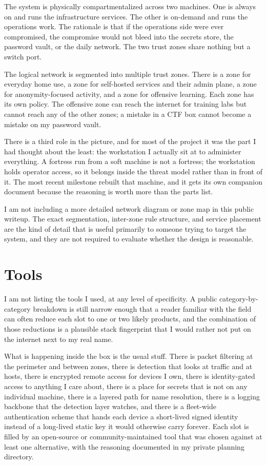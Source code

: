 \documentclass[12pt]{article}
\begin{document}
The system is physically compartmentalized across two machines. One is always on and runs the infrastructure services. The other is on-demand and runs the operations work. The rationale is that if the operations side were ever compromised, the compromise would not bleed into the secrets store, the password vault, or the daily network. The two trust zones share nothing but a switch port.

The logical network is segmented into multiple trust zones. There is a zone for everyday home use, a zone for self-hosted services and their admin plane, a zone for anonymity-focused activity, and a zone for offensive learning. Each zone has its own policy. The offensive zone can reach the internet for training labs but cannot reach any of the other zones; a mistake in a CTF box cannot become a mistake on my password vault.

There is a third role in the picture, and for most of the project it was the part I had thought about the least: the workstation I actually sit at to administer everything. A fortress run from a soft machine is not a fortress; the workstation holds operator access, so it belongs inside the threat model rather than in front of it. The most recent milestone rebuilt that machine, and it gets its own companion document because the reasoning is worth more than the parts list.

I am not including a more detailed network diagram or zone map in this public writeup. The exact segmentation, inter-zone rule structure, and service placement are the kind of detail that is useful primarily to someone trying to target the system, and they are not required to evaluate whether the design is reasonable.

\section{Tools}

I am not listing the tools I used, at any level of specificity. A public category-by-category breakdown is still narrow enough that a reader familiar with the field can often reduce each slot to one or two likely products, and the combination of those reductions is a plausible stack fingerprint that I would rather not put on the internet next to my real name.

What is happening inside the box is the usual stuff. There is packet filtering at the perimeter and between zones, there is detection that looks at traffic and at hosts, there is encrypted remote access for devices I own, there is identity-gated access to anything I care about, there is a place for secrets that is not on any individual machine, there is a layered path for name resolution, there is a logging backbone that the detection layer watches, and there is a fleet-wide authentication scheme that hands each device a short-lived signed identity instead of a long-lived static key it would otherwise carry forever. Each slot is filled by an open-source or community-maintained tool that was chosen against at least one alternative, with the reasoning documented in my private planning directory.
\end{document}
